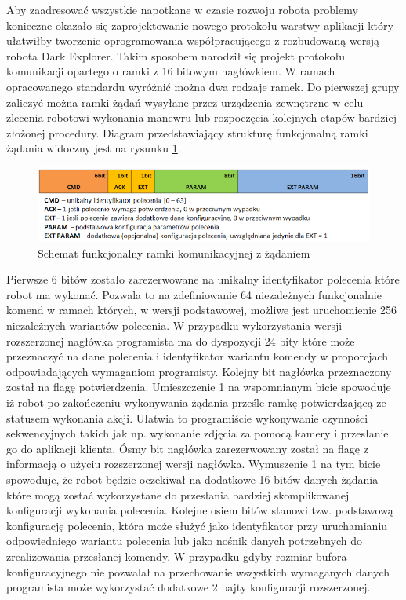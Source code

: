 Aby zaadresować wszystkie napotkane w czasie rozwoju robota problemy konieczne
okazało się zaprojektowanie nowego protokołu warstwy aplikacji który ułatwiłby
tworzenie oprogramowania współpracującego z rozbudowaną wersją robota Dark
Explorer. Takim sposobem narodził się projekt protokołu komunikacji opartego o
ramki z 16 bitowym nagłówkiem. W ramach opracowanego standardu wyróżnić można
dwa rodzaje ramek. Do pierwszej grupy zaliczyć można ramki żądań wysyłane przez
urządzenia zewnętrzne w celu zlecenia robotowi wykonania manewru lub rozpoczęcia
kolejnych etapów bardziej złożonej procedury. Diagram przedstawiający strukturę
funkcjonalną ramki żądania widoczny jest na rysunku \ref{fig:RfcommReqFrame}.

\begin{figure}[h!] 
 \centering
 \includegraphics[width=\textwidth]{../images/ch05/req_schema2.png}
 \caption{Schemat funkcjonalny ramki komunikacyjnej z żądaniem}
 \label{fig:RfcommReqFrame}
\end{figure}

Pierwsze 6 bitów zostało zarezerwowane na unikalny identyfikator polecenia które
robot ma wykonać. Pozwala to na zdefiniowanie 64 niezależnych funkcjonalnie
komend w ramach których, w wersji podstawowej, możliwe jest uruchomienie 256
niezależnych wariantów polecenia. W przypadku wykorzystania wersji rozszerzonej
nagłówka programista ma do dyspozycji 24 bity które może przeznaczyć na dane
polecenia i identyfikator wariantu komendy w proporcjach odpowiadających
wymaganiom programisty. Kolejny bit nagłówka przeznaczony został na flagę potwierdzenia.
Umieszczenie 1 na wspomnianym bicie spowoduje iż robot po zakończeniu
wykonywania żądania prześle ramkę potwierdzającą ze statusem wykonania akcji.
Ułatwia to programiście wykonywanie czynności sekwencyjnych takich jak np. wykonanie
zdjęcia za pomocą kamery i przesłanie go do aplikacji klienta. Ósmy bit nagłówka
zarezerwowany został na flagę z informacją o użyciu rozszerzonej wersji
nagłówka. Wymuszenie 1 na tym bicie spowoduje, że robot będzie oczekiwał na
dodatkowe 16 bitów danych żądania które mogą zostać wykorzystane do przesłania
bardziej skomplikowanej konfiguracji wykonania polecenia. Kolejne osiem bitów
stanowi tzw. podstawową konfigurację polecenia, która może służyć jako
identyfikator przy uruchamianiu odpowiedniego wariantu polecenia lub jako nośnik
danych potrzebnych do zrealizowania przesłanej komendy. W przypadku gdyby
rozmiar bufora konfiguracyjnego nie pozwalał na przechowanie wszystkich
wymaganych danych programista może wykorzystać dodatkowe 2 bajty konfiguracji
rozszerzonej.

